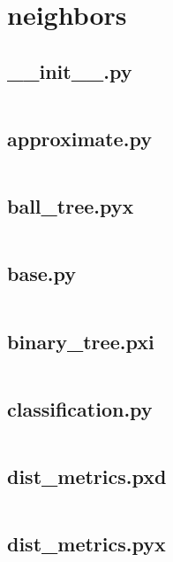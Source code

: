 \documentclass{article}
\begin{document}
\section{neighbors}

\subsection{\_\_init\_\_.py}
\inputminted{python}{/home/dufferzafar/dev/@clones/scikit-learn/sklearn/neighbors/__init__.py}
\newpage

\subsection{approximate.py}
\inputminted{python}{/home/dufferzafar/dev/@clones/scikit-learn/sklearn/neighbors/approximate.py}
\newpage

\subsection{ball\_tree.pyx}
\inputminted{cython}{/home/dufferzafar/dev/@clones/scikit-learn/sklearn/neighbors/ball_tree.pyx}
\newpage

\subsection{base.py}
\inputminted{python}{/home/dufferzafar/dev/@clones/scikit-learn/sklearn/neighbors/base.py}
\newpage

\subsection{binary\_tree.pxi}
\inputminted{cython}{/home/dufferzafar/dev/@clones/scikit-learn/sklearn/neighbors/binary_tree.pxi}
\newpage

\subsection{classification.py}
\inputminted{python}{/home/dufferzafar/dev/@clones/scikit-learn/sklearn/neighbors/classification.py}
\newpage

\subsection{dist\_metrics.pxd}
\inputminted{cython}{/home/dufferzafar/dev/@clones/scikit-learn/sklearn/neighbors/dist_metrics.pxd}
\newpage

\subsection{dist\_metrics.pyx}
\inputminted{cython}{/home/dufferzafar/dev/@clones/scikit-learn/sklearn/neighbors/dist_metrics.pyx}
\newpage
\end{document}
